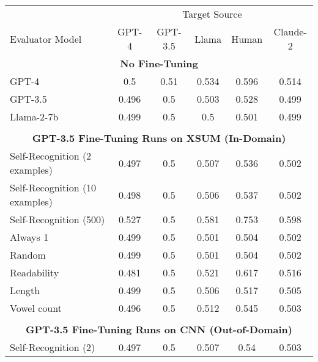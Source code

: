 \begin{table}[h]
    \centering
    \begin{tabular}{l|ccccc}
                                       & \multicolumn{5}{c}{Target Source} \\ 
    Evaluator Model                    & GPT-4 & GPT-3.5 & Llama & Human & Claude-2 \\
    \hline
    \multicolumn{6}{c}{\textbf{No Fine-Tuning}} \\
    GPT-4                              & 0.5         & 0.51        & 0.534       & 0.596       & 0.514       \\
    GPT-3.5                            & 0.496       & 0.5         & 0.503       & 0.528       & 0.499       \\
    Llama-2-7b                         & 0.499       & 0.5         & 0.5         & 0.501       & 0.499       \\
    \multicolumn{6}{c}{} \\
    \multicolumn{6}{c}{\textbf{GPT-3.5 Fine-Tuning Runs on XSUM (In-Domain)}} \\
    Self-Recognition (2 examples)              & 0.497       & 0.5         & 0.507       & 0.536       & 0.502       \\
    Self-Recognition (10 examples)             & 0.498       & 0.5         & 0.506       & 0.537       & 0.502       \\
    Self-Recognition (500)                     & 0.527       & 0.5         & 0.581       & 0.753       & 0.598       \\
    Always 1                           & 0.499       & 0.5         & 0.501       & 0.504       & 0.502       \\
    Random                             & 0.499       & 0.5         & 0.501       & 0.504       & 0.502       \\
    Readability                        & 0.481       & 0.5         & 0.521       & 0.617       & 0.516       \\
    Length                             & 0.499       & 0.5         & 0.506       & 0.517       & 0.505       \\
    Vowel count                        & 0.496       & 0.5         & 0.512       & 0.545       & 0.503       \\
    \multicolumn{6}{c}{} \\
    \multicolumn{6}{c}{\textbf{GPT-3.5 Fine-Tuning Runs on CNN (Out-of-Domain)}} \\
    Self-Recognition (2)                       & 0.497       & 0.5         & 0.507       & 0.54        & 0.503       \\

\end{tabular}
\end{table}
